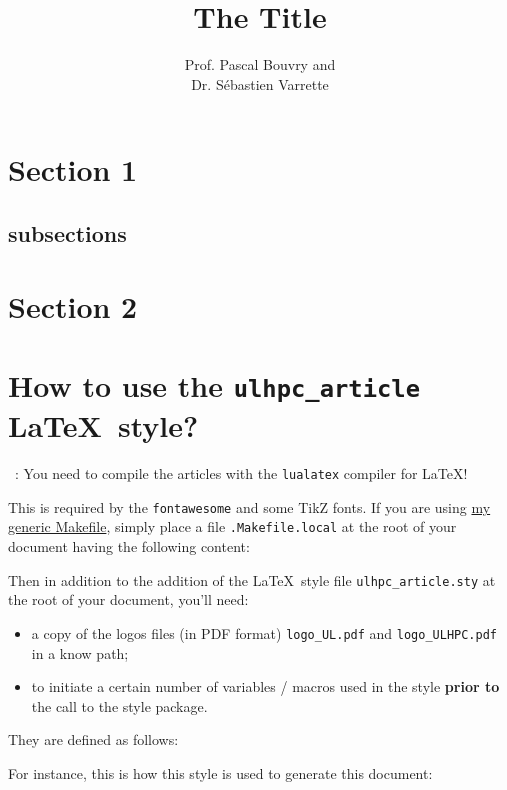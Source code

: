 \documentclass{article}
\title{The Title}
\author{%
  Prof. Pascal Bouvry and\\
  Dr. S\'ebastien Varrette
}
\begin{document}
\coverpages

\section{Section 1}

\lipsum[1]

\subsection{subsections}

\lipsum[2]

\section{Section 2}

\begin{tcolorbox}
  \lipsum[3]
\end{tcolorbox}

\newpage
\section{How to use the \texttt{ulhpc\_article} \LaTeX\ style?}

\begin{tcolorbox}[colback=red!5!white]
\faWarningSign\ : You need to compile the articles with the \texttt{lualatex} compiler for \LaTeX!  
\end{tcolorbox}
This is required by the \texttt{fontawesome} and some TikZ fonts. 
If you are using \href{https://github.com/Falkor/Makefiles/blob/devel/latex/Makefile}{my generic Makefile}, 
simply place a file \texttt{.Makefile.local} at the root of your document having the following content:



\noindent Then in addition to the addition of the \LaTeX\ style file \texttt{ulhpc\_article.sty} at the root of your document, you'll need: 
\begin{itemize}
  \item a copy of the logos files (in PDF format) \texttt{logo\_UL.pdf} and \texttt{logo\_ULHPC.pdf} in a know path;
  \item to initiate a certain number of variables / macros used in the style \textbf{prior to} the call to the style package.
\end{itemize}

\noindent They are defined as follows: 



For instance, this is how this style is used to generate this document: 


\end{document}
